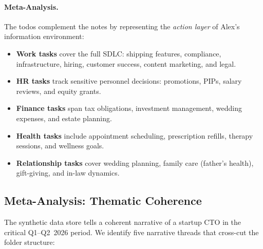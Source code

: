 \paragraph{Meta-Analysis.}
The todos complement the notes by representing the \emph{action layer} of Alex's information environment:

\begin{itemize}[nosep]
    \item \textbf{Work tasks} cover the full SDLC: shipping features, compliance, infrastructure, hiring, customer success, content marketing, and legal.
    \item \textbf{HR tasks} track sensitive personnel decisions: promotions, PIPs, salary reviews, and equity grants.
    \item \textbf{Finance tasks} span tax obligations, investment management, wedding expenses, and estate planning.
    \item \textbf{Health tasks} include appointment scheduling, prescription refills, therapy sessions, and wellness goals.
    \item \textbf{Relationship tasks} cover wedding planning, family care (father's health), gift-giving, and in-law dynamics.
\end{itemize}

\subsection{Meta-Analysis: Thematic Coherence}
\label{sec:thematic-coherence}

The synthetic data store tells a coherent narrative of a startup CTO in the critical Q1--Q2~2026 period.
We identify five narrative threads that cross-cut the folder structure:

